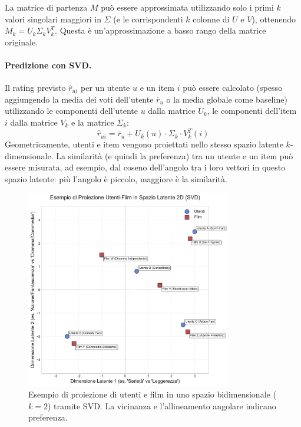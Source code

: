 \documentclass{article}
\begin{document}
La matrice di partenza $M$ può essere approssimata utilizzando solo i primi $k$ valori singolari maggiori in $\Sigma$ (e le corrispondenti $k$ colonne di $U$ e $V$), ottenendo $M_k = U_k \Sigma_k V_k^T$. Questa è un'approssimazione a basso rango della matrice originale.

\paragraph{Predizione con SVD.}
Il rating previsto $\hat{r}_{ui}$ per un utente $u$ e un item $i$ può essere calcolato (spesso aggiungendo la media dei voti dell'utente $\overline{r}_u$ o la media globale come baseline) utilizzando le componenti dell'utente $u$ dalla matrice $U_k$, le componenti dell'item $i$ dalla matrice $V_k$ e la matrice $\Sigma_k$:
$$ \hat{r}_{ui} = \overline{r}_u + U_k(u) \cdot \Sigma_k \cdot V_k^T(i) $$
Geometricamente, utenti e item vengono proiettati nello stesso spazio latente $k$-dimensionale. La similarità (e quindi la preferenza) tra un utente e un item può essere misurata, ad esempio, dal coseno dell'angolo tra i loro vettori in questo spazio latente: più l'angolo è piccolo, maggiore è la similarità.

\begin{figure}[H]
    \centering
    \includegraphics[width=0.8\textwidth]{images/svd_projection_example.pdf}
    \caption{Esempio di proiezione di utenti e film in uno spazio bidimensionale ($k=2$) tramite SVD. La vicinanza e l'allineamento angolare indicano preferenza.}
    \label{fig:svd_projection}
\end{figure}
\end{document}

